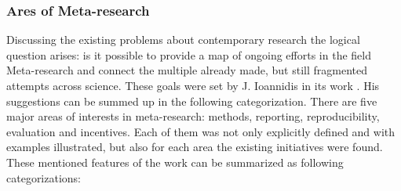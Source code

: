 		\subsubsection{Ares of Meta-research}
		Discussing the existing problems about contemporary research the logical question arises: is it possible to provide a map of ongoing efforts in the field Meta-research and connect the multiple already made, but still fragmented attempts across science. These goals were set by J. Ioannidis in its work \frqq \cite{Ioa15}. \newline
		His suggestions can be summed up in the following categorization. There are five major areas of interests in meta-research: methods, reporting, reproducibility, evaluation and incentives. Each of them was not only explicitly defined and with examples illustrated, but also for each area the existing initiatives were found. These mentioned features of the work can be summarized as following categorizations:
		\label{sec:AreasOfMetaresearch:cat}  
